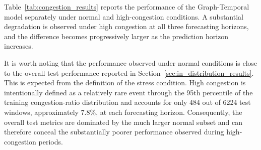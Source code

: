 Table~\ref{tab:congestion_results} reports the performance of the
Graph-Temporal model separately under normal and high-congestion conditions.
A substantial degradation is observed under high congestion at all three
forecasting horizons, and the difference becomes progressively larger as the
prediction horizon increases.

\begin{table}[t]
    \centering
    \caption{Performance of the Graph-Temporal model under normal and
    high-congestion conditions on the test set.}
    \label{tab:congestion_results}
\end{table}

It is worth noting that the performance observed under normal conditions is
close to the overall test performance reported in
Section~\ref{sec:in_distribution_results}. This is expected from the
definition of the stress condition. High congestion is intentionally defined
as a relatively rare event through the 95th percentile of the training
congestion-ratio distribution and accounts for only 484 out of 6224 test
windows, approximately 7.8\%, at each forecasting horizon. Consequently,
the overall test metrics are dominated by the much larger normal subset and
can therefore conceal the substantially poorer performance observed during
high-congestion periods.

